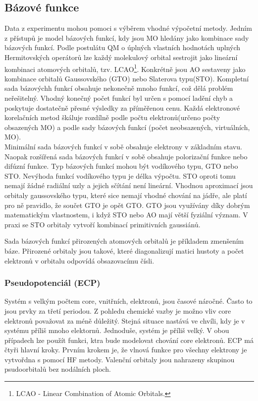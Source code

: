 \documentclass[
  digital, %
  table,   %
  lof,     %
  lot,     %
  oneside,
]{fithesis3}
\begin{document}
\subsection{Bázové funkce}
Data z experimentu mohou pomoci s výběrem vhodné výpočetní metody. Jedním z přístupů je model bázových funkcí, kdy jsou MO hledány jako kombinace sady bázových funkcí. Podle postulátu QM o úplných vlastních hodnotách uplných Hermitovských operátorů lze každý molekulový orbital sestrojit jako lineární kombinaci atomových orbitalů, tzv. LCAO\footnote{LCAO - Linear Combination of Atomic Orbitals.}. Konkrétně jsou AO sestaveny jako kombinace orbitalů Gaussovského (GTO) nebo Slaterova typu(STO).
Kompletní sada bázovýchh funkcí obsahuje nekonečně mnoho funkcí, což dělá problém neřešitelný. Vhodný konečný počet funkcí byl určen s pomocí ladění chyb a poskytuje dostatečně přesné výsledky za příměřenou cenu. Každá elektronové korelačních metod škáluje rozdílně podle počtu elektronů(určeno počty obsazených MO) a podle sady bázových funkcí (počet neobsazených, virtuálních, MO).\\
Minimální sada bázových funkcí v sobě obsahuje elektrony v základním stavu. Naopak rozšířená sada bázových funkcí v sobě obsahuje polorizační funkce nebo difúzní funkce. Typ bázových funkcí mohou být vodíkového typu, GTO nebo STO. Nevýhoda funkcí vodíkového typu je délka výpočtu. STO oproti tomu nemají žádné radiální uzly a jejich sčítání není lineární. Vhodnou aproximací jsou orbitaly gaussovského typu, které sice nemají vhodné chování na jádře, ale platí pro ně pravidlo, že součet GTO je opět GTO.\cite{lowe2011quantum} GTO jsou využívány díky dobrým matematickým vlastnostem, i když STO nebo AO mají větší fyziální význam. V praxi se STO orbitaly vytvoří kombinací primitivních gaussiánů.

Sada bázových funkcí přirozených atomových orbitalů je příkladem zmenšením báze. Přirozené orbitaly jsou takové, které diagonalizují matici hustoty a počet elektronů v orbitalu odpovídá obsazovacímu čísli.

\subsubsection{Pseudopotenciál (ECP)}
Systém s velkým počtem core, vnitřních, elektronů, jsou časové náročné. Často to jsou prvky za třetí periodou. Z pohledu chemické vazby je možno vliv core elektronů považovat za méně důležitý. Stejná situace nastává ve chvíli, kdy je v systému příliš mnoho elektornů. Jednoduše, systém je příliš velký. V obou případech lze použít funkci, ktra bude modelovat chování core elektronů. ECP má čtyři hlavní kroky. Prvním krokem je, že vlnová funkce pro všechny elektrony je vytvořdna s pomocí HF metody. Valenční orbitaly jsou nahrazeny skupinou psudoorbitalů bez nodálních ploch.
\end{document}
